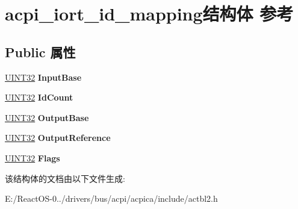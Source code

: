 \hypertarget{structacpi__iort__id__mapping}{}\section{acpi\+\_\+iort\+\_\+id\+\_\+mapping结构体 参考}
\label{structacpi__iort__id__mapping}
\subsection*{Public 属性}
\begin{DoxyCompactItemize}
\item 
\mbox{\label{structacpi__iort__id__mapping_aafe81cbb0bdfe470eae8cd1a9e41f3ae}} 
\hyperlink{_processor_bind_8h_ae1e6edbbc26d6fbc71a90190d0266018}{U\+I\+N\+T32} {\bfseries Input\+Base}
\item 
\mbox{\label{structacpi__iort__id__mapping_a122a26abe323efb99c6352663191a338}} 
\hyperlink{_processor_bind_8h_ae1e6edbbc26d6fbc71a90190d0266018}{U\+I\+N\+T32} {\bfseries Id\+Count}
\item 
\mbox{\label{structacpi__iort__id__mapping_a990e199730b8024dae24e195be0ea575}} 
\hyperlink{_processor_bind_8h_ae1e6edbbc26d6fbc71a90190d0266018}{U\+I\+N\+T32} {\bfseries Output\+Base}
\item 
\mbox{\label{structacpi__iort__id__mapping_a739b3c4abeca0d78fa54a55f9a3a687e}} 
\hyperlink{_processor_bind_8h_ae1e6edbbc26d6fbc71a90190d0266018}{U\+I\+N\+T32} {\bfseries Output\+Reference}
\item 
\mbox{\label{structacpi__iort__id__mapping_aa2232067de5dceba0d73204fec79ae9d}} 
\hyperlink{_processor_bind_8h_ae1e6edbbc26d6fbc71a90190d0266018}{U\+I\+N\+T32} {\bfseries Flags}
\end{DoxyCompactItemize}


该结构体的文档由以下文件生成\+:\begin{DoxyCompactItemize}
\item 
E\+:/\+React\+O\+S-\/0../drivers/bus/acpi/acpica/include/actbl2.\+h\end{DoxyCompactItemize}
